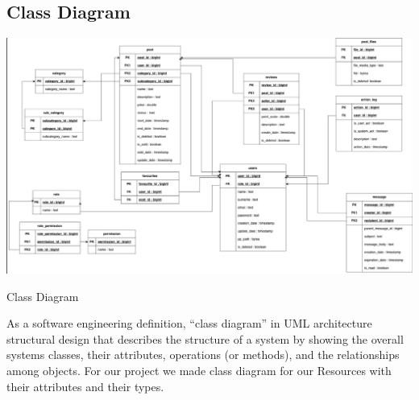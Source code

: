 \subsection{Class Diagram}
\includegraphics[scale = 0.65]{classDiagram.pdf}
\begin{center}
\caption{Class Diagram}
\end{center} 
\hspace{5mm}As a software engineering definition, “class diagram” in UML architecture structural design that describes the structure of a system by showing the overall systems classes, their attributes, operations (or methods), and the relationships among objects. For our project we made class diagram for our Resources with their attributes and their types. \newline




